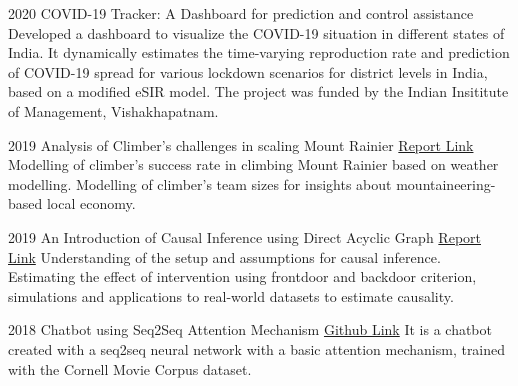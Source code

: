 \documentclass[11pt]{developercv} %
\begin{document}
\begin{entrylist}
    \vspace*{-5pt}
    \entry
    {2020}
    {COVID-19 Tracker: A Dashboard for prediction and control assistance}
    {}
    {\small Developed a dashboard to visualize the COVID-19 situation in different states of India. It dynamically estimates the time-varying reproduction rate and prediction of COVID-19 spread for various lockdown scenarios for district levels in India, based on a modified eSIR model. The project was funded by the Indian Insititute of Management, Vishakhapatnam.}

    \vspace*{-5pt}
    \entry
    {2019}
    {Analysis of Climber's challenges in scaling Mount Rainier}
    {\href{https://github.com/subroy13/mount-rainier-case-study}{Report Link} }
    {\small Modelling of climber's success rate in climbing Mount Rainier based on weather modelling. Modelling of climber's team sizes for insights about mountaineering-based local economy.}

    \vspace*{-5pt}
    \entry
    {2019}
    {An Introduction of Causal Inference using Direct Acyclic Graph}
    {\href{https://www.statwizard.in/aboutme/causal-dag/final-report.pdf}{Report Link} }
    {\small Understanding of the setup and assumptions for causal inference. Estimating the effect of intervention using frontdoor and backdoor criterion, simulations and applications to real-world datasets to estimate causality.}

    \vspace*{-5pt}
    \entry
    {2018}
    {Chatbot using Seq2Seq Attention Mechanism}
    {\href{https://github.com/subroy13/seq2seq-attention-bot}{Github Link}}
    {\small It is a chatbot created with a seq2seq neural network with a basic attention mechanism, trained with the Cornell Movie Corpus dataset.}
\end{entrylist}
\end{document}
